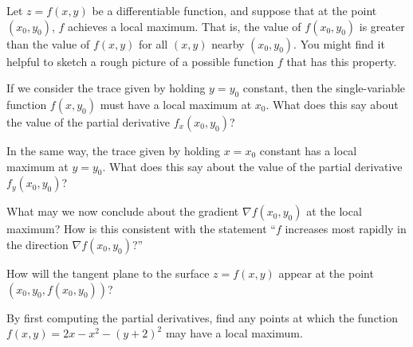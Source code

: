 \begin{pa} \label{PA:10.7} 
Let $z = f(x,y)$ be a differentiable function, and suppose that at the point $(x_0, y_0)$, $f$ achieves a local maximum.  That is, the value of $f(x_0,y_0)$ is greater than the value of $f(x,y)$ for all $(x,y)$ nearby $(x_0,y_0)$.  You might find it helpful to sketch a rough picture of a possible function $f$ that has this property.

  \ba 
  \item If we consider the trace given by
    holding $y=y_0$ constant, then the single-variable function $f(x, y_0)$ must have a local maximum at
    $x_0$.  What does this say about the value of the partial derivative
    $f_x(x_0,y_0)$? 
     
  \item In the same way, the trace given by holding $x=x_0$ constant
    has a local maximum at $y=y_0$.  What does this say about the value of the
    partial derivative $f_y(x_0,y_0)$?
    
  \item What may we now conclude about the gradient $\nabla f(x_0,y_0)$ at the
    local maximum?  How is this consistent with the statement ``$f$
    increases most rapidly in the direction $\nabla f(x_0,y_0)$?''
    
  \item How will the tangent plane to the surface $z = f(x,y)$ appear at the point $(x_0, y_0, f(x_0,y_0))$?
  
  \item By first computing the partial derivatives, find any points at which the function $f(x,y) = 2x -   x^2 - (y + 2)^2$ may have a local maximum.
  \ea
\end{pa} 

